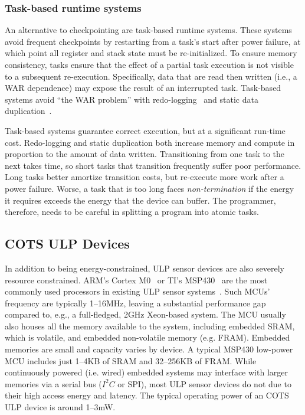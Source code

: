 \subsubsection{Task-based runtime systems}
\label{chapter:background:intermittent:task}
An alternative to checkpointing are task-based runtime systems.
% 
These systems avoid frequent checkpoints by
restarting from a task's start after power failure,
at which point all register and stack state must be re-initialized.
% 
To ensure memory consistency, tasks ensure that the effect of a
partial task execution is not visible to a subsequent re-execution.
Specifically, data that are read then written (i.e., a WAR dependence) may expose the result of an interrupted task.
% 
Task-based systems avoid ``the WAR problem'' with
redo-logging~\cite{alpaca} and static data duplication~\cite{chain}.


Task-based systems guarantee correct execution, but at a significant run-time cost.
% 
Redo-logging and static duplication both increase memory and compute
in proportion to the amount of data written.
% 
Transitioning from one task to the next takes time, so
short tasks that transition frequently suffer poor performance.
Long tasks better amortize transition costs,
but re-execute more work after a power failure.
% 
Worse, a task that is too long faces {\em non-termination} if the energy it
requires exceeds the energy that the device can buffer.
% 
The programmer, therefore, needs to be careful in splitting a program into atomic tasks.

\subsection{COTS ULP Devices}
In addition to being energy-constrained, ULP sensor devices are also severely resource constrained.
% 
ARM's Cortex M0~\cite{cortexm0} or TI's MSP430~\cite{msp430fr5994} are 
the most commonly used processors in existing ULP sensor
systems~\cite{wisp,capybara,flicker,ufop,amulet,wolverine}.
%
Such MCUs' frequency are typically 1--16MHz, leaving a
substantial performance gap compared to, e.g., a full-fledged, 2GHz Xeon-based
system.  
%
The MCU usually also houses all the memory available to
the system, including embedded SRAM, which is volatile, and embedded non-volatile memory (e.g. FRAM).  
%
Embedded memories are small and capacity varies by device. 
% 
A typical MSP430
low-power MCU includes just 1--4KB of SRAM and 32--256KB of FRAM.
% 
While
continuously powered (i.e. wired) embedded systems may interface with larger memories
via a serial bus ($I^{2}C$ or SPI), most ULP sensor devices do
not due to their high access energy and latency.
%
The typical operating power of an COTS ULP device is around 1--3mW.

